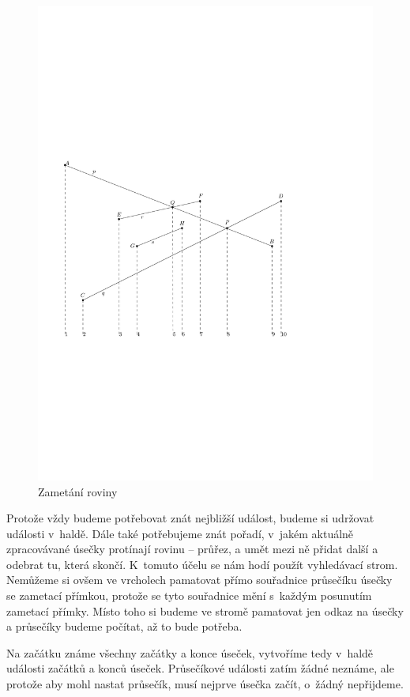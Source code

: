 \begin{figure}[h]
	\centering
	\includegraphics{../img/zametani.pdf}
	\caption{Zametání roviny}
	\label{fig:zametani}
\end{figure}

Protože vždy budeme potřebovat znát nejbližší událost, budeme si udržovat
události v~haldě. Dále také potřebujeme znát pořadí, v~jakém aktuálně
zpracovávané úsečky protínají rovinu -- průřez, a umět mezi ně přidat další a
odebrat tu, která skončí. K~tomuto účelu se nám hodí použít vyhledávací strom.
Nemůžeme si ovšem ve vrcholech pamatovat přímo souřadnice průsečíku úsečky se
zametací přímkou, protože se tyto souřadnice mění s~každým posunutím zametací
přímky. Místo toho si budeme ve stromě pamatovat jen odkaz na úsečky a průsečíky
budeme počítat, až to bude potřeba.

Na začátku známe všechny začátky a konce úseček, vytvoříme tedy v~haldě události
začátků a konců úseček. Průsečíkové události zatím žádné neznáme, ale protože
aby mohl nastat průsečík, musí nejprve úsečka začít, o~žádný nepřijdeme.

